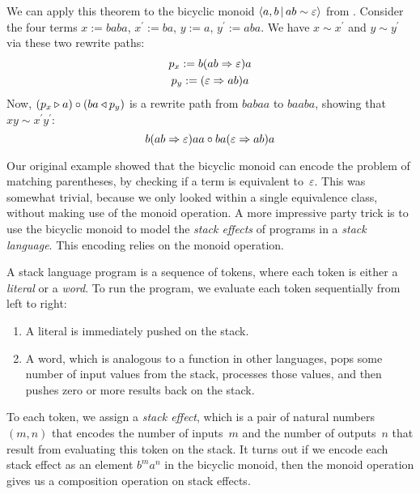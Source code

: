 \documentclass[../generics]{subfiles}
\begin{document}
\begin{example}\label{bicyclic 5}
We can apply this theorem to the bicyclic monoid $\langle a, b\,|\,ab\sim\varepsilon\rangle$ from . Consider the four terms $x := baba$, $x^\prime := ba$, $y := a$, $y^\prime := aba$. We have $x\sim x^\prime$ and $y\sim y^\prime$ via these two rewrite paths:
\begin{gather*}
p_x := b(ab\Rightarrow\varepsilon) a\\
p_y := (\varepsilon\Rightarrow ab) a
\end{gather*}
Now, $(p_x\triangleright a)\circ (ba\triangleleft p_y)$ is a rewrite path from $babaa$ to $baaba$, showing that $xy\sim x^\prime y^\prime$:
\[b(ab\Rightarrow\varepsilon) aa\circ ba(\varepsilon\Rightarrow ab) a\]

Our original example showed that the bicyclic monoid can encode the problem of matching parentheses, by checking if a term is equivalent to~$\varepsilon$. This was somewhat trivial, because we only looked within a single equivalence class, without making use of the monoid operation. A more impressive party trick is to use the bicyclic monoid to model the \emph{stack effects} of programs in a \emph{stack language}. This encoding relies on the monoid operation.

A stack language program is a sequence of tokens, where each token is either a \emph{literal} or a \emph{word}. To run the program, we evaluate each token sequentially from left to right:
\begin{enumerate}
\item A literal is immediately pushed on the stack.
\item A word, which is analogous to a function in other languages, pops some number of input values from the stack, processes those values, and then pushes zero or more results back on the stack.
\end{enumerate}

To each token, we assign a \emph{stack effect}, which is a pair of natural numbers $(m,n)$ that encodes the number of inputs~$m$ and the number of outputs~$n$ that result from evaluating this token on the stack. It turns out if we encode each stack effect as an element $b^m a^n$ in the bicyclic monoid, then the monoid operation gives us a composition operation on stack effects.


\end{example}
\end{document}
